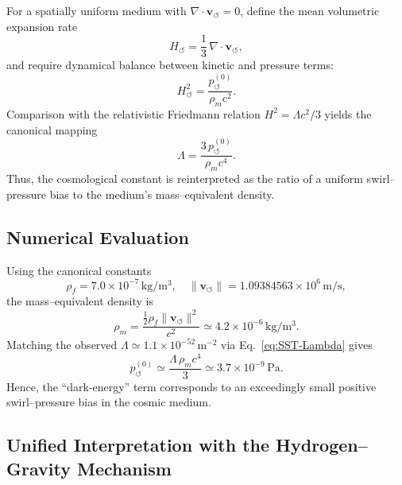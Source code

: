 \documentclass[10pt,reprint,aps,onecolumn,nofootinbib]{revtex4-2}
\begin{document}
        For a spatially uniform medium with $\nabla\!\cdot\!\mathbf{v}_{\!\boldsymbol{\circlearrowleft}} = 0$, define the mean volumetric expansion rate
        \begin{equation}
        H_{\!\circlearrowleft} = \frac{1}{3}\,\nabla\!\cdot\!\mathbf{v}_{\!\boldsymbol{\circlearrowleft}},
        \end{equation}
        and require dynamical balance between kinetic and pressure terms:
        \begin{equation}
        H_{\!\circlearrowleft}^{2} = \frac{p_{\!\circlearrowleft}^{(0)}}{\rho_{\!m} c^{2}}.
        \end{equation}
        Comparison with the relativistic Friedmann relation $H^{2} = \Lambda c^{2}/3$ yields the canonical mapping
        \begin{equation}
        \Lambda = \frac{3\,p_{\!\circlearrowleft}^{(0)}}{\rho_{\!m} c^{4}}.
        \label{eq:SST-Lambda}
        \end{equation}
        Thus, the cosmological constant is reinterpreted as the ratio of a uniform swirl--pressure bias to the medium’s mass--equivalent density.

    \subsection{Numerical Evaluation}

        Using the canonical constants
        \[
            \rho_{\!f} = 7.0\times10^{-7}\,\mathrm{kg/m^{3}},
            \quad
            \lVert\mathbf{v}_{\!\boldsymbol{\circlearrowleft}}\rVert = 1.09384563\times10^{6}\,\mathrm{m/s},
        \]
        the mass--equivalent density is
        \[
            \rho_{\!m} = \frac{\tfrac12\rho_{\!f}\lVert\mathbf{v}_{\!\boldsymbol{\circlearrowleft}}\rVert^{2}}{c^{2}}
            \simeq 4.2\times10^{-6}\,\mathrm{kg/m^{3}}.
        \]
        Matching the observed $\Lambda\simeq1.1\times10^{-52}\,\mathrm{m^{-2}}$ via Eq.~\eqref{eq:SST-Lambda} gives
        \begin{equation}
        p_{\!\circlearrowleft}^{(0)} \simeq
        \frac{\Lambda\,\rho_{\!m} c^{4}}{3}
        \simeq 3.7\times10^{-9}\,\mathrm{Pa}.
        \end{equation}
        Hence, the ``dark-energy'' term corresponds to an exceedingly small positive swirl--pressure bias in the cosmic medium.

    \subsection{Unified Interpretation with the Hydrogen--Gravity Mechanism}
\end{document}
